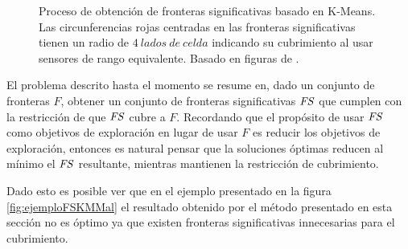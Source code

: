 \begin{figure}[H]
  \caption[Proceso de obtención de fronteras significativas basado en K-Means.]{Proceso de
    obtención de fronteras significativas basado en K-Means. Las circunferencias rojas
    centradas en las fronteras significativas tienen un radio de $4\ lados\ de\ celda$ indicando su cubrimiento
    al usar sensores de rango equivalente. Basado en figuras de \cite{Amorin2019}.}\label{fig:ejemploFrontSig}
\end{figure}


El problema descrito hasta el momento se resume en, dado un conjunto de
fronteras $F$, obtener un conjunto de fronteras significativas $\mathit{FS}$ que
cumplen con la restricción de que $\mathit{FS}$ cubre a $F$. Recordando que el
propósito de usar $\mathit{FS}$ como objetivos de exploración en lugar de usar $F$
es reducir los objetivos de exploración, entonces es natural pensar que la
soluciones óptimas reducen al mínimo el $\mathit{FS}$ resultante, mientras
mantienen la restricción de cubrimiento.


Dado esto es posible ver que en el ejemplo presentado en la figura
\ref{fig:ejemploFSKMMal} el resultado obtenido por el método presentado en esta
sección no es óptimo ya que existen fronteras significativas innecesarias para
el cubrimiento. 

